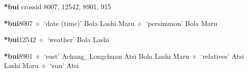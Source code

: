 \item
\textbf{*bui}
  {\tiny crossid 8007, 12542, 8901, 915}
  \begin{list}{}{\leftmargin=1.5em \itemindent=-1.5em}
  \item {\footnotesize \textbf{*bui}}{\tiny 8007}
         $\diamond$~`date (time)'
         Bola 
\hspace{1ex}
         Lashi 
\hspace{1ex}
         Maru 
\hspace{1ex}
         $\diamond$~`persimmon'
         Bola 
\hspace{1ex}
         Maru 
  \item {\footnotesize \textbf{*bui}}{\tiny 12542}
\hspace{1ex}
         $\diamond$~`weather'
         Bola 
\hspace{1ex}
         Lashi 
  \item {\footnotesize \textbf{*bui}}{\tiny 8901}
\hspace{1ex}
         $\diamond$~`east'
         Achang\_Longchuan 
\hspace{1ex}
         Atsi 
\hspace{1ex}
         Bola 
\hspace{1ex}
         Lashi 
\hspace{1ex}
         Maru 
\hspace{1ex}
         $\diamond$~`relatives'
         Atsi 
\hspace{1ex}
         Lashi 
\hspace{1ex}
         Maru 
\hspace{1ex}
         $\diamond$~`sun'
         Atsi 
\hspace{1ex}

\end{list}
